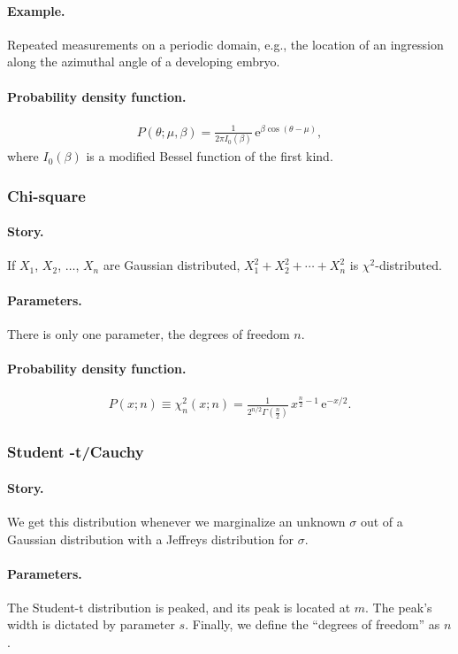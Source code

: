 \paragraph{Example.} Repeated measurements on a periodic domain, e.g.,
the location of an ingression along the azimuthal angle of a
developing embryo.
\paragraph{Probability density function.}
\begin{align}
P(\theta;\mu, \beta) = \frac{1}{2\pi I_0(\beta)}\,\mathrm{e}^{\beta \cos(\theta - \mu)},
\end{align}
where $I_0(\beta)$ is a modified Bessel function of the first kind.


\subsubsection{Chi-square}
\paragraph{Story.} If $X_1$,
$X_2$, $\ldots$, $X_n$ are Gaussian distributed,
$X_1^2 + X_2^2 + \cdots + X_n^2$ is $\chi^2$-distributed.
\paragraph{Parameters.} There is only one parameter, the degrees of
freedom $n$.
\paragraph{Probability density function.}
\begin{align}
  P(x;n) \equiv \chi^2_n(x;n) = \frac{1}{2^{n/2}\Gamma\left(\frac{n}{2}\right)}\,
x^{\frac{n}{2}-1}\,\mathrm{e}^{-x/2}.
\end{align}


\subsubsection{Student -t/Cauchy}
\paragraph{Story.}  We get this distribution whenever we marginalize
an unknown $\sigma$ out of a Gaussian distribution with a Jeffreys
distribution for $\sigma$.
\paragraph{Parameters.} The Student-t distribution is peaked, and its
peak is located at $m$.  The peak's width is dictated by parameter
$s$.  Finally, we define the ``degrees of freedom'' as $n$.
